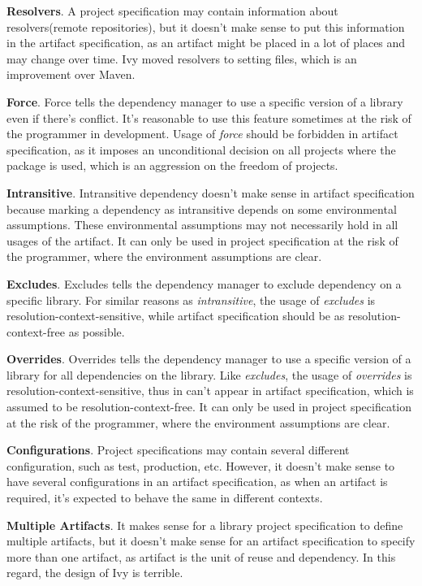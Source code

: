 \textbf{Resolvers}. A project specification may contain information about resolvers(remote repositories), but it doesn't make sense to put this information in the artifact specification, as an artifact might be placed in a lot of places and may change over time. Ivy moved resolvers to setting files, which is an improvement over Maven.

\textbf{Force}. Force tells the dependency manager to use a specific version of a library even if there's conflict. It's reasonable to use this feature sometimes at the risk of the programmer in development. Usage of \emph{force} should be forbidden in artifact specification, as it imposes an unconditional decision on all projects where the package is used, which is an aggression on the freedom of projects.

\textbf{Intransitive}. Intransitive dependency doesn't make sense in artifact specification because marking a dependency as intransitive depends on some environmental assumptions. These environmental assumptions may not necessarily hold in all usages of the artifact. It can only be used in project specification at the risk of the programmer, where the environment assumptions are clear.

\textbf{Excludes}. Excludes tells the dependency manager to exclude dependency on a specific library. For similar reasons as \emph{intransitive}, the usage of \emph{excludes} is resolution-context-sensitive, while artifact specification should be as resolution-context-free as possible.

\textbf{Overrides}. Overrides tells the dependency manager to use a specific version of a library for all dependencies on the library. Like \emph{excludes}, the usage of \emph{overrides} is resolution-context-sensitive, thus in can't appear in artifact specification, which is assumed to be resolution-context-free. It can only be used in project specification at the risk of the programmer, where the environment assumptions are clear.

\textbf{Configurations}. Project specifications may contain several different configuration, such as test, production, etc. However, it doesn't make sense to have several configurations in an artifact specification, as when an artifact is required, it's expected to behave the same in different contexts.

\textbf{Multiple Artifacts}. It makes sense for a library project specification to define multiple artifacts, but it doesn't make sense for an artifact specification to specify more than one artifact, as artifact is the unit of reuse and dependency. In this regard, the design of Ivy is terrible.


